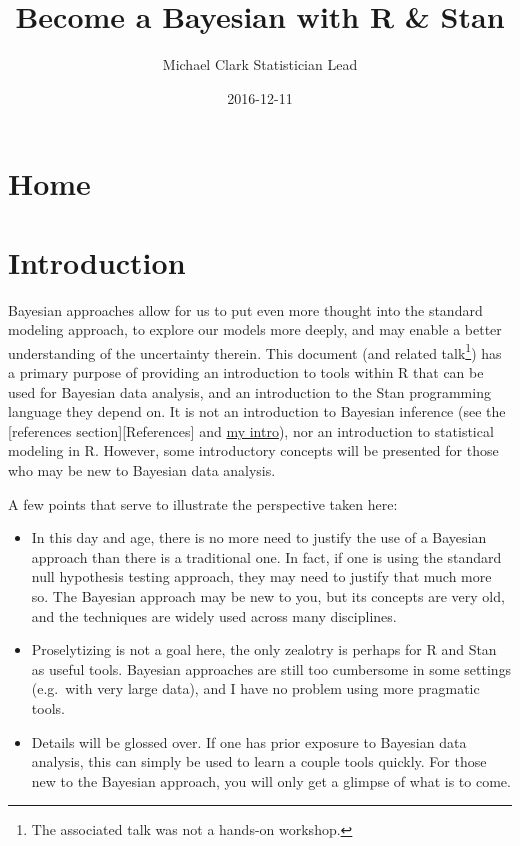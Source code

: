 \documentclass[]{book}
\title{{Become a Bayesian with R \& Stan}}
\author{{Michael Clark} {Statistician Lead}}
\date{2016-12-11}
\let\rmarkdownfootnote\footnote%
\def\footnote{\protect\rmarkdownfootnote}
\begin{document}
\maketitle

{
\setcounter{tocdepth}{1}
\tableofcontents
}
\chapter{\texorpdfstring{{Home}}{Home}}\label{home}

\chapter{Introduction}\label{introduction}

 Bayesian
approaches allow for us to put even more thought into the standard
modeling approach, to explore our models more deeply, and may enable a
better understanding of the uncertainty therein. This document (and
related talk\footnote{The associated talk was not a hands-on workshop.})
has a primary purpose of providing an introduction to tools within R
that can be used for Bayesian data analysis, and an introduction to the
Stan programming language they depend on. It is not an introduction to
Bayesian inference (see the {[}references section{]}{[}References{]} and
\href{http://m-clark.github.io/docs/IntroBayes.html}{my intro}), nor an
introduction to statistical modeling in R. However, some introductory
concepts will be presented for those who may be new to Bayesian data
analysis.

A few points that serve to illustrate the perspective taken here:

\begin{itemize}
\item
  In this day and age, there is no more need to justify the use of a
  Bayesian approach than there is a traditional one. In fact, if one is
  using the standard null hypothesis testing approach, they may need to
  justify that much more so. The Bayesian approach may be new to you,
  but its concepts are very old, and the techniques are widely used
  across many disciplines.
\item
  Proselytizing is not a goal here, the only zealotry is perhaps for R
  and Stan as useful tools. Bayesian approaches are still too cumbersome
  in some settings (e.g.~with very large data), and I have no problem
  using more pragmatic tools.
\item
  Details will be glossed over. If one has prior exposure to Bayesian
  data analysis, this can simply be used to learn a couple tools
  quickly. For those new to the Bayesian approach, you will only get a
  glimpse of what is to come.
\end{itemize}
\end{document}
